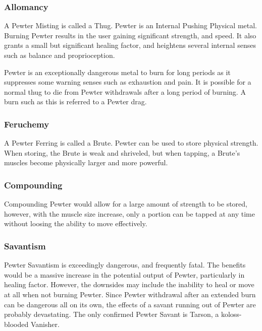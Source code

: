 \documentclass[conference]{IEEEtran}
\begin{document}
\subsubsection*{\textbf{Allomancy}}
A Pewter Misting is called a Thug.\cite{ARS}  Pewter is an Internal Pushing Physical metal.\cite{AL-TB}  Burning Pewter results in the user gaining significant strength, and speed.\cite{ARS}  It also grants a small but significant healing factor,\cite{HoA-CH26} and heightens several internal senses such as balance and proprioception.\cite{TFE-CH5}

Pewter is an exceptionally dangerous metal to burn for long periods\cite{TFE-CH24}\cite{TFE-CH25} as it suppresses some warning senses such as exhaustion and pain.\cite{TFE-CH7}  It is possible for a normal thug to die from Pewter withdrawals after a long period of burning.  A burn such as this is referred to a Pewter drag.\cite{TFE-CH26}\\
\subsubsection*{\textbf{Feruchemy}}
A Pewter Ferring is called a Brute.\cite{ARS}  Pewter can be used to store physical strength.  When storing, the Brute is weak and shriveled, but when tapping, a Brute's muscles become physically larger and more powerful.\cite{WoA-CH53} \\
\subsubsection*{\textbf{Compounding}}
Compounding Pewter would allow for a large amount of strength to be stored, however, with the muscle size increase, only a portion can be tapped at any time without loosing the ability to move effectively.\cite{Bodybuilder}\\
\subsubsection*{\textbf{Savantism}}
Pewter Savantism is exceedingly dangerous, and frequently fatal.\cite{WoF}  The benefits would be a massive increase in the potential output of Pewter, particularly in healing factor.\cite{AoL-CH17}  However, the downsides may include the inability to heal or move at all when not burning Pewter.\cite{HoA-CH56}  Since Pewter withdrawal after an extended burn can be dangerous all on its own, the effects of a savant running out of Pewter are probably devastating.\cite{WoF}  The only confirmed Pewter Savant is Tarson, a koloss-blooded Vanisher.\cite{AoL-CH17} \\
\end{document}

